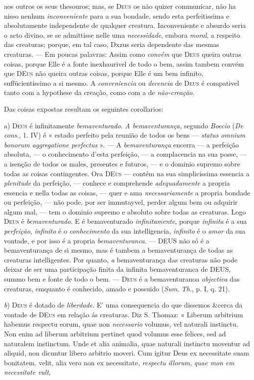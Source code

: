 aos outros os seus thesouros; mas, se \textsc{Deus} os não quizer communicar, não ha nisso nenhum \emph{inconveniente} para a sua bondade, sendo esta perfeitissima e absolutamente independente de qualquer creatura. Inconveniente e absurdo seria o acto divino, se se admittisse nelle uma \emph{necessidade}, embora \emph{moral}, a respeito das creaturas; porque, em tal caso, Dxzus seria dependente das mesmas creaturas. --- Em poucas palavras: Assim como \emph{convém} que \textsc{Deus} queira outras coisas, porque Elle é a fonte inexhaurivel de todo o bem, assim tambem convém que \textsc{DEus} não queira outras coisas, porque Elle é um bem infinito, suffücientissimo a si mesmo. A \emph{conveniencia} ou \emph{decencia} de \textsc{Deus} é compativel tanto com a hypothese da creação, como com a de \emph{não-creação}.\par *\par Das coisas expostas resultam os seguintes corollarios:\par a) \textsc{Deus} é infinitamente \emph{bemaventurado}. \emph{A bemaventurança}, segundo \emph{Boecio} (\emph{De cons}., 1. IV) é « estado perfeito pela reunião de todos os bens --- \emph{status omnium bonorum aggregatione perfectus} ». --- A \emph{bemaventurança} encerra --- a perfeição absoluta, --- o conhecimento d'esta perfeição, --- a complacencia na sua posse, --- a isenção de todos os males, presentes e futuros, --- e o dominio supremo sobre todas as coisas contingentes. Ora \textsc{DEus} --- contém na sua simplicissima essencia a \emph{plenitude} da perfeição, --- conhece e comprehende \emph{adequadamente} a propria essencia e nella todas as coisas, --- quer e ama \emph{necessariamente} a propria bondade ou perfeição, --- não pode, por ser immutayvel, perder algum bem ou adquirir algum mal, --- tem o dominio supremo e absoluto sobre todas as creaturas. Logo \textsc{Deus} é \emph{bemaventurado}. E é bemaventurado \emph{infinitamente}, porque \emph{infinita} é a sua \emph{perfeição}, \emph{infinito} é o \emph{conhecimento} da sua intelligencia, \emph{infinito} é o \emph{amor} da sua vontade, e por isso é a propria \emph{bemaventuranca}. --- \textsc{DEUS} não só é a bemaventurança de si mesmo, mas é tambem a bemaventurança de todas as creaturas intelligentes. Por quanto, \emph{a} bemaventurança das creaturas não pode deixar de ser uma participação finita da infinita bemaventuranca de \textsc{DEUS}, summo bem e fonte de todo o bem. --- \textsc{Deus} é a bemaventuranoa \emph{objectiva} das creaturas, emquanto é conhecido, amado e possuido (\emph{Sum}. \emph{Th}., p. I, q. 21).\par \emph{b}) \textsc{Deus} é dotado de \emph{liberdade}. E' uma consequencia do que dissemos \&cerca da vontade de \textsc{DEus} em relação ás creaturas. Diz S. Thomaz: « Liberum arbitrium habemus respectu eorum, quae non \emph{necessario} volumus, vel naturali instinctu. Non enim ad liberum arbitrium pertinet quod volumus esse felices, sed ad naturalem instinctum. Unde et alia animalia, quae naturali instinctu moventur ad aliquid, non dicuntur libero arbitrio moveri. Cum igitur Deus ex necessitate suam bonitatem. velit, alia vero non ex necessitate, \emph{respectu illorum}, \emph{quae mon em necessitate vult}, 